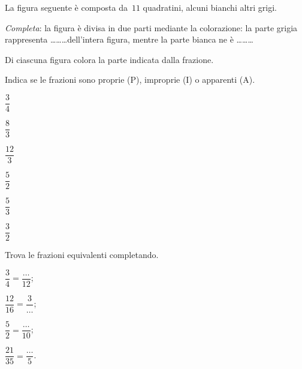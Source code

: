 \begin{esercizio}
 \label{ese:3.3}
La figura seguente è composta da~$11$ quadratini, alcuni bianchi altri grigi.
\begin{center}
 
\end{center}
\emph{Completa}: la figura è divisa in due parti mediante la colorazione: la parte grigia
rappresenta \ldots\ldots\ldots dell'intera figura, mentre la parte bianca ne è \ldots\ldots\ldots
\end{esercizio}

\begin{esercizio}
 \label{ese:3.4}
 Di ciascuna figura colora la parte indicata dalla frazione.
\begin{center}
 
\end{center}
\end{esercizio}

\begin{esercizio}
\label{ese:3.5}
 Indica se le frazioni sono proprie (P), improprie (I) o apparenti (A).
 \begin{multicols}{3}
 \TabPositions{0.6cm}
 \begin{enumeratea}
 \item $\dfrac{3}{4}$ \tab\quad\boxP\quad\boxI\quad\boxA\vspace{1.1ex}
 \item $\dfrac{8}{3}$ \tab\quad\boxP\quad\boxI\quad\boxA
 \item $\dfrac{12}{3}$ \tab\quad\boxP\quad\boxI\quad\boxA\vspace{1.1ex}
 \item $\dfrac{5}{2}$ \tab\quad\boxP\quad\boxI\quad\boxA
 \item $\dfrac{5}{3}$ \tab\quad\boxP\quad\boxI\quad\boxA\vspace{1.1ex}
 \item $\dfrac{3}{2}$ \tab\quad\boxP\quad\boxI\quad\boxA
 \end{enumeratea}
 \end{multicols}
\end{esercizio}

\begin{esercizio}
\label{ese:3.6}
Trova le frazioni equivalenti completando.
 \begin{multicols}{4}
 \begin{enumeratea}
 	\item $\dfrac{3}{4}=\dfrac{\ldots}{12}$;
 	\item $\dfrac{12}{16}=\dfrac{3}{\ldots}$;
 	\item $\dfrac{5}{2}=\dfrac{\ldots}{10}$;
 	\item $\dfrac{21}{35}=\dfrac{\ldots}{5}$.
 \end{enumeratea}
 \end{multicols}
\end{esercizio}

